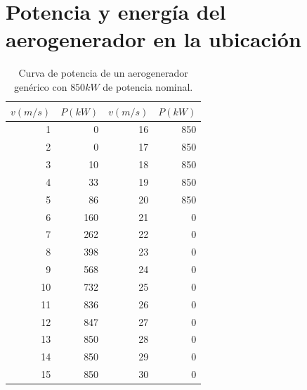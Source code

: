 \documentclass[12pt]{report}
\begin{document}
\section{Potencia y energía del aerogenerador en la ubicación}






\begin{table}[H]
    \centering
    \begin{tabular}{r r r r}
        \hline
        $v(m/s)$ & $P(kW)$ & $v(m/s)$ & $P(kW)$ \\
        \hline
        1 & 0 & 16 & 850 \\
        2 & 0 & 17 & 850 \\
        3 & 10 & 18 & 850 \\
        4 & 33 & 19 & 850 \\
        5 & 86 & 20 & 850 \\
        6 & 160 & 21 & 0 \\
        7 & 262 & 22 & 0 \\
        8 & 398 & 23 & 0 \\
        9 & 568 & 24 & 0 \\
        10 & 732 & 25 & 0 \\
        11 & 836 & 26 & 0 \\
        12 & 847 & 27 & 0 \\
        13 & 850 & 28 & 0 \\
        14 & 850 & 29 & 0 \\
        15 & 850 & 30 & 0 \\
        \hline
    \end{tabular}
    \caption{Curva de potencia de un aerogenerador genérico con $850 kW$ de potencia nominal.}
    \label{Tabla: Curva de potencia}
\end{table}
\end{document}
